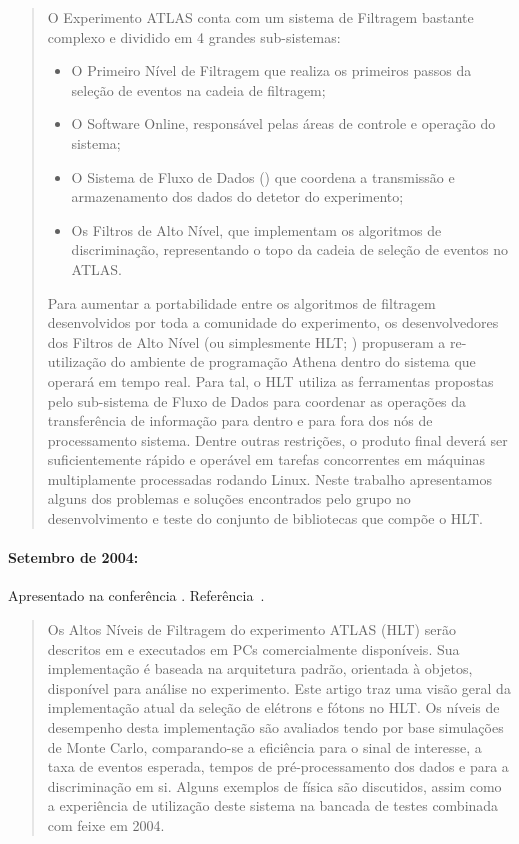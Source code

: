 \begin{quotation}
O Experimento ATLAS conta com um sistema de Filtragem bastante complexo e
dividido em 4 grandes sub-sistemas:
\begin{itemize}
\item O Primeiro Nível de Filtragem que realiza os primeiros passos da seleção
de eventos na cadeia de filtragem;
\item O Software Online, responsável pelas áreas de controle e operação do sistema;
\item O Sistema de Fluxo de Dados () que coordena a transmissão
e armazenamento dos dados do detetor do experimento;
\item Os Filtros de Alto Nível, que implementam os algoritmos de
discriminação, representando o topo da cadeia de seleção de eventos no ATLAS.
\end{itemize}
Para aumentar a portabilidade entre os algoritmos de filtragem desenvolvidos
por toda a comunidade do experimento, os desenvolvedores dos Filtros de Alto
Nível (ou simplesmente HLT; ) propuseram a
re-utilização do ambiente de programação  Athena dentro do sistema
que operará em tempo real. Para tal, o HLT utiliza as ferramentas propostas
pelo sub-sistema de Fluxo de Dados para coordenar as operações da
transferência de informação para dentro e para fora dos nós de processamento
sistema. Dentre outras restrições, o produto final deverá ser suficientemente
rápido e operável em tarefas concorrentes em máquinas multiplamente
processadas rodando Linux.  Neste trabalho apresentamos alguns dos problemas e
soluções encontrados pelo grupo no desenvolvimento e teste do conjunto de
bibliotecas que compõe o HLT.
\end{quotation}

\paragraph{Setembro de 2004: } Apresentado na conferência . Referência~\cite{aa:chep-04-01}.

\begin{quotation}
Os Altos Níveis de Filtragem do experimento ATLAS (HLT) serão descritos em
 e executados em PCs comercialmente disponíveis. Sua
implementação é baseada na arquitetura padrão, orientada à objetos, disponível
para análise  no experimento. Este artigo traz uma visão geral da
implementação atual da seleção de elétrons e fótons no HLT. Os níveis de
desempenho desta implementação são avaliados tendo por base simulações de
Monte Carlo, comparando-se a eficiência para o sinal de interesse, a taxa de
eventos esperada, tempos de pré-processamento dos dados e para a discriminação
em si. Alguns exemplos de física são discutidos, assim como a experiência de
utilização deste sistema na bancada de testes combinada com feixe em 2004.
\end{quotation}

